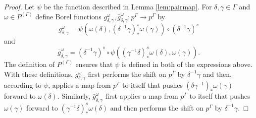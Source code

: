\documentclass[10pt,a4paper]{amsart}
\begin{document}
\begin{proof}
	Let $\psi$ be the function described in Lemma \ref{lem:pairmap}. For $\delta, \gamma \in \Gamma$ and $\omega \in P^{(\Gamma)}$ define Borel functions $g_{\delta, \gamma}^\omega, \bar g_{\delta, \gamma}^\omega : p^\Gamma \rightarrow p^\Gamma$ by
	\[g_{\delta, \gamma}^\omega = \psi(\omega(\delta), (\delta^{-1} \gamma)^s_* \omega(\gamma)) \circ (\delta^{-1} \gamma)^s\]
	and
	\[\bar g_{\delta, \gamma}^\omega = (\delta^{-1} \gamma)^s \circ \psi((\gamma^{-1} \delta)^s_* \omega(\delta), \omega(\gamma)).\]
	The definition of $P^{(\Gamma)}$ ensures that $\psi$ is defined in both of the expressions above. With these definitions, $g_{\delta, \gamma}^\omega$ first performs the shift on $p^\Gamma$ by $\delta^{-1} \gamma$ and then, according to $\psi$, applies a map from $p^\Gamma$ to itself that pushes $(\delta \gamma^{-1})_* \omega(\gamma)$ forward to $\omega(\delta)$. Similarly, $\bar g_{\delta, \gamma}^\omega$ first applies a map from $p^\Gamma$ to itself that pushes $\omega(\gamma)$ forward to $(\gamma^{-1} \delta)^s_* \omega(\delta)$ and then performs the shift on $p^\Gamma$ by $\delta^{-1} \gamma$.
	

\end{proof}
\end{document}
